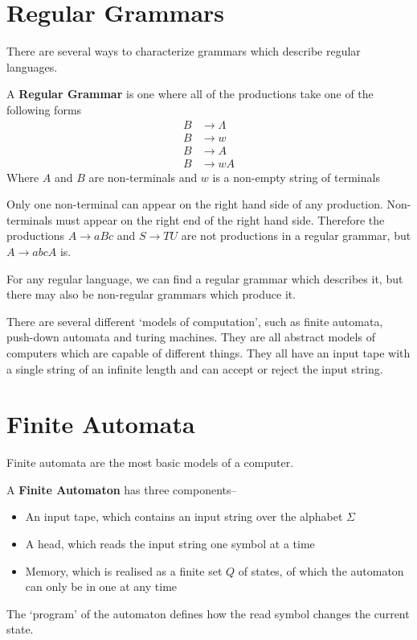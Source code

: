 \section*{Regular Grammars}

There are several ways to characterize grammars which describe regular languages.

\begin{definition*}{}{}
  A \textbf{Regular Grammar} is one where all of the productions take one of the following forms
  \begin{align*}
    B &\rightarrow \Lambda\\
    B &\rightarrow w\\
    B &\rightarrow A\\
    B &\rightarrow wA
  \end{align*}
  Where $A$ and $B$ are non-terminals and $w$ is a non-empty string of terminals
\end{definition*}

Only one non-terminal can appear on the right hand side of any production. Non-terminals must appear on the right end
 of the right hand side. Therefore the productions $A \rightarrow aBc$ and $S \rightarrow TU$ are not productions in a
 regular grammar, but $A \rightarrow abcA$ is.

For any regular language, we can find a regular grammar which describes it, but there may also be non-regular grammars
 which produce it.




There are several different `models of computation', such as finite automata, push-down automata and turing machines.
 They are all abstract models of computers which are capable of different things. They all have an input tape with a
 single string of an infinite length and can accept or reject the input string.

\section*{Finite Automata}

Finite automata are the most basic models of a computer.

\begin{definition*}{}{}
  A \textbf{Finite Automaton} has three components--
  \begin{itemize}
    \item An input tape, which contains an input string over the alphabet $\Sigma$
    \item A head, which reads the input string one symbol at a time
    \item Memory, which is realised as a finite set $Q$ of states, of which the automaton can only be in one at any time
  \end{itemize}

  The `program' of the automaton defines how the read symbol changes the current state.
\end{definition*}

